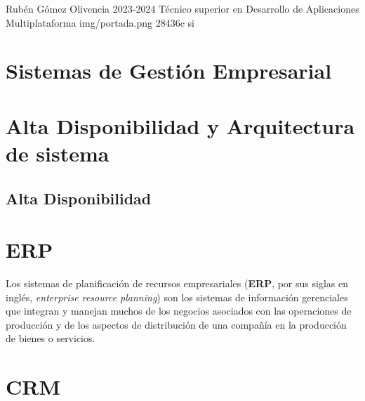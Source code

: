\documentclass{\ClassPath/yukibook}
\begin{document}
    {Rubén Gómez Olivencia}  %
    {2023-2024}    %
    {Técnico superior en \linebreak Desarrollo de  Aplicaciones Multiplataforma} %
    {}%
    {}%
    {img/portada.png} %
    {28436c}
    {si} %

    \coverpage
    \graphicspath{{../../../yukibook.cls/}}
    \licensepage

    \tableofcontents


    \part{Sistemas de Gestión Empresarial}
    \graphicspath{{./img/sge}}
    

    \part{Alta Disponibilidad y Arquitectura de sistema}
    \chapter{Alta Disponibilidad}
    
    \graphicspath{{../../../temas_comunes/arquitectura_sistemas/img/}}
    



    \part{ERP}
Los sistemas de planificación de recursos empresariales (\textbf{ERP}, por sus siglas en inglés, \textit{enterprise resource planning}) son los sistemas de información gerenciales que integran y manejan muchos de los negocios asociados con las operaciones de producción y de los aspectos de distribución de una compañía en la producción de bienes o servicios.


\part{CRM}
\end{document}
